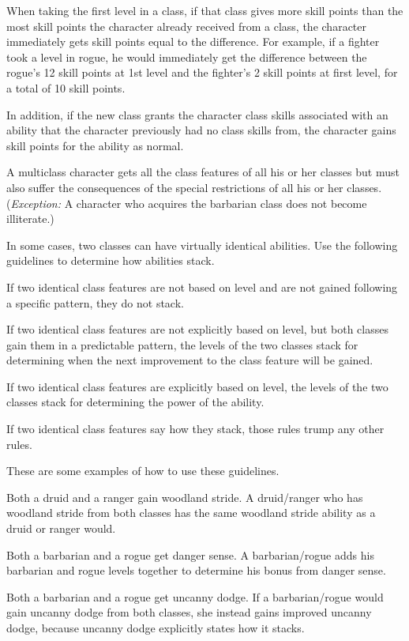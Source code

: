  When taking the first level in a class, if that class gives more skill points than the most skill points the character already received from a class, the character immediately gets skill points equal to the difference. For example, if a fighter took a level in rogue, he would immediately get the difference between the rogue's 12 skill points at 1st level and the fighter's 2 skill points at first level, for a total of 10 skill points.

\par In addition, if the new class grants the character class skills associated with an ability that the character previously had no class skills from, the character gains skill points for the ability as normal.

 A multiclass character gets all the class features
of all his or her classes but must also suffer the consequences of the
special restrictions of all his or her classes. (\emph{Exception:} A character
who acquires the barbarian class does not become illiterate.)

\par In some cases, two classes can have virtually identical abilities.
Use the following guidelines to determine how abilities stack.
\begin{itemize*}
\item If two identical class features are not based on level and are not gained following a specific pattern, they do not stack.
\item If two identical class features are not explicitly based on level, but both classes gain them in a predictable pattern, the levels of the two classes stack for determining when the next improvement to the class feature will be gained.
\item If two identical class features are explicitly based on level, the levels of the two classes stack for determining the power of the ability.
\item If two identical class features say how they stack, those rules trump any other rules.
\end{itemize*}
These are some examples of how to use these guidelines.
\begin{itemize*}
\item Both a druid and a ranger gain woodland stride. A druid/ranger who has woodland stride from both classes has the same woodland stride ability as a druid or ranger would.
\item Both a barbarian and a rogue get danger sense. A barbarian/rogue adds his barbarian and rogue levels together to determine his bonus from danger sense.
\item Both a barbarian and a rogue get uncanny dodge. If a barbarian/rogue would gain uncanny dodge from both classes, she instead gains improved uncanny dodge, because uncanny dodge explicitly states how it stacks.
\end{itemize*}


